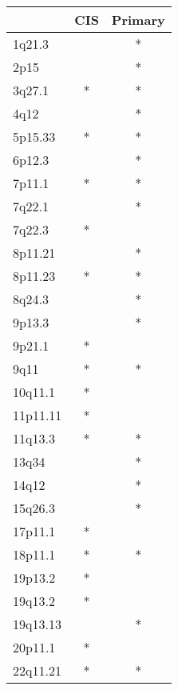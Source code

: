 \begin{tabular}{lcc}
\toprule
{} & CIS & Primary \\
\midrule
1q21.3   &     &       * \\
2p15     &     &       * \\
3q27.1   &   * &       * \\
4q12     &     &       * \\
5p15.33  &   * &       * \\
6p12.3   &     &       * \\
7p11.1   &   * &       * \\
7q22.1   &     &       * \\
7q22.3   &   * &         \\
8p11.21  &     &       * \\
8p11.23  &   * &       * \\
8q24.3   &     &       * \\
9p13.3   &     &       * \\
9p21.1   &   * &         \\
9q11     &   * &       * \\
10q11.1  &   * &         \\
11p11.11 &   * &         \\
11q13.3  &   * &       * \\
13q34    &     &       * \\
14q12    &     &       * \\
15q26.3  &     &       * \\
17p11.1  &   * &         \\
18p11.1  &   * &       * \\
19p13.2  &   * &         \\
19q13.2  &   * &         \\
19q13.13 &     &       * \\
20p11.1  &   * &         \\
22q11.21 &   * &       * \\
\bottomrule
\end{tabular}

